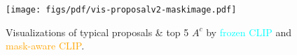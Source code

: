 \begin{figure}
\begin{center}
   \texttt{[image: figs/pdf/vis-proposalv2-maskimage.pdf]}
\end{center}
\vspace{-2mm}
   \caption{
   Visualizations of typical proposals \& top 5 $A^c$ by \textcolor{cyan}{frozen CLIP} and \textcolor{orange}{mask-aware CLIP}.
   }
\label{fig:vis-proposal}
\end{figure}
